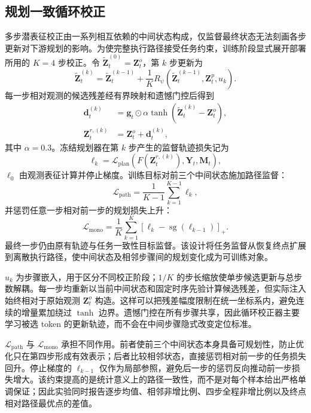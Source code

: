 \documentclass[letterpaper,10pt,conference]{ieeeconf}
\newcommand{\sg}{\operatorname{sg}}
\begin{document}
\subsection{规划一致循环校正}

多步潜表征校正由一系列相互依赖的中间状态构成，仅监督最终状态无法刻画各步更新对下游规划的影响。为使完整执行路径接受任务约束，训练阶段显式展开部署所用的 $K=4$ 步校正。令 $\tilde{\mathbf Z}^{(0)}_t=\mathbf Z_t^o$，第 $k$ 步更新为
\begin{equation}
\tilde{\mathbf Z}^{(k)}_t=\tilde{\mathbf Z}^{(k-1)}_t+
\frac{1}{K}R_\psi(\tilde{\mathbf Z}^{(k-1)}_t,\mathbf Z_t^p,u_k).
\label{eq:iterative_update}
\end{equation}
每一步相对观测的候选残差经有界映射和遗憾门控后得到
\begin{align}
\mathbf d_t^{(k)}&=\mathbf g_t\odot
\alpha\tanh(\tilde{\mathbf Z}^{(k)}_t-\mathbf Z_t^o),\nonumber\\
\mathbf Z_t^{r,(k)}&=\mathbf Z_t^o+\mathbf d_t^{(k)},
\label{eq:gated_residual}
\end{align}
其中 $\alpha=0.3$。冻结规划器在第 $k$ 步产生的监督轨迹损失记为
\begin{equation}
\ell_k=\mathcal L_{\mathrm{plan}}(F(\mathbf Z_t^{r,(k)}),\mathbf Y_t,\mathbf M_t),
\label{eq:step_loss}
\end{equation}
$\ell_0$ 由观测表征计算并停止梯度。训练目标对前三个中间状态施加路径监督：
\begin{equation}
\mathcal L_{\mathrm{path}}=\frac{1}{K-1}\sum_{k=1}^{K-1}\ell_k,
\label{eq:path_loss}
\end{equation}
并惩罚任意一步相对前一步的规划损失上升：
\begin{equation}
\mathcal L_{\mathrm{mono}}=\frac{1}{K}\sum_{k=1}^{K}
\left[\ell_k-\sg(\ell_{k-1})\right]_+ .
\label{eq:mono_loss}
\end{equation}
最终一步仍由原有轨迹与任务一致性目标监督。该设计将任务监督从恢复终点扩展到离散执行路径，使中间状态及相邻步骤间的规划变化成为可训练对象。

$u_k$ 为步骤嵌入，用于区分不同校正阶段；$1/K$ 的步长缩放使单步候选更新与总步数解耦。每一步均重新以当前中间状态和固定时序先验计算候选残差，但实际注入始终相对于原始观测 $\mathbf Z_t^o$ 构造。这样可以把残差幅度限制在统一坐标系内，避免连续的增量累加绕过 $\tanh$ 边界。遗憾门控在所有步骤共享，因此循环校正器主要学习被选 token 的更新轨迹，而不会在中间步骤隐式改变定位标准。

$\mathcal L_{\mathrm{path}}$ 与 $\mathcal L_{\mathrm{mono}}$ 承担不同作用。前者使前三个中间状态本身具备可规划性，防止优化只在第四步形成有效表示；后者比较相邻状态，直接惩罚相对前一步的任务损失回升。停止梯度的 $\ell_{k-1}$ 仅作为局部参照，避免后一步的惩罚反向推动前一步损失增大。该约束提高的是统计意义上的路径一致性，而不是对每个样本给出严格单调保证；因此实验同时报告逐步均值、相邻非增比例、四步全程非增比例以及终点相对路径最优点的差值。
\end{document}
